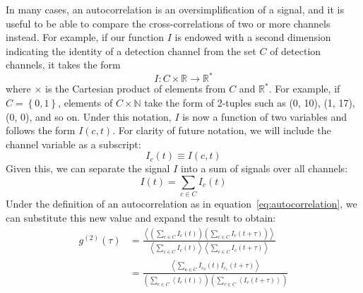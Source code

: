 \documentclass{article}
\newcommand{\braces}[1]{\ensuremath{\left\lbrace #1 \right\rbrace}}
\newcommand{\angles}[1]{\ensuremath{\left\langle #1 \right\rangle}}
\newcommand{\gn}[1]{\ensuremath{g^{(#1)}}}
\newcommand{\wholes}{\ensuremath{\mathbb{N}}}
\newcommand{\reals}{\ensuremath{\mathbb{R}}}
\renewcommand{\vec}{\boldsymbol}
\newcommand{\channel}{\ensuremath{c}}
\newcommand{\channels}{\ensuremath{C}}
\begin{document}
In many cases, an autocorrelation is an oversimplification of a signal, and it is useful to be able to compare the cross-correlations of two or more channels instead. For example, if our function $I$ is endowed with a second dimension indicating the identity of a detection channel from the set $C$ of detection channels, it takes the form
\begin{equation}
I:C\times\reals\rightarrow\reals^{*}
\end{equation}
where $\times$ is the Cartesian product of elements from $\channels$ and $\reals^{*}$. For example, if $\channels=\braces{0, 1}$, elements of $\channels\times\wholes$ take the form of 2-tuples such as (0, 10), (1, 17), (0, 0), and so on. Under this notation, $I$ is now a function of two variables and follows the form $I(c, t)$. For clarity of future notation, we will include the channel variable as a subscript:
\begin{equation}
I_{c}(t)\equiv I(c,t) 
\end{equation}
Given this, we can separate the signal $I$ into a sum of signals over all channels:
\begin{equation}
I(t) = \sum_{c\in C}{I_{c}(t)}
\end{equation}
Under the definition of an autocorrelation as in equation~\ref{eq:autocorrelation}, we can substitute this new value and expand the result to obtain:
\begin{align}
\label{eq:signal_g2}
\gn{2}(\tau) &= \frac
     {\angles{
       \left(\sum_{\channel\in\channels}{I_{c}(t)}\right)
       \left(\sum_{\channel\in\channels}{I_{c}(t+\tau)}\right)}}
     {\angles{\sum_{\channel\in\channels}{I_{c}(t)}}
      \angles{\sum_{\channel\in\channels}{I_{c}(t+\tau)}}} \\
             &= \frac{\angles{\sum_{\vec{\channel}\in\channels}{
                             I_{c_{0}}(t)I_{c_{1}}(t+\tau)}}}
                     {\left(\sum_{\channel\in\channels}{\angles{I_{c}(t)}}\right)
                      \left(\sum_{\channel\in\channels}{\angles{I_{c}(t+\tau)}}\right)}
\end{align}
\end{document}
